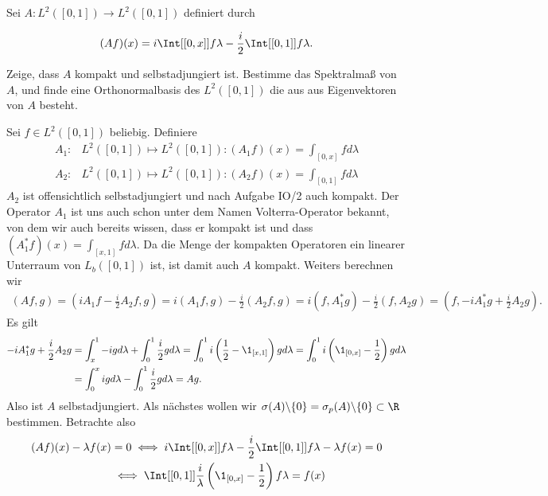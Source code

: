 \begin{exercise}[37/2]

Sei $A: L^2([0, 1]) \to L^2([0, 1])$ definiert durch

\begin{align*}
  (A f)(x)
  =
  i
  \Int[{[0, x]}]{f}{\lambda}
  - \frac{i}{2}
  \Int[{[0, 1]}]{f}{\lambda}.
\end{align*}

Zeige, dass $A$ kompakt und selbstadjungiert ist.
Bestimme das Spektralmaß von $A$, und finde eine Orthonormalbasis des $L^2([0, 1])$ die aus aus Eigenvektoren von $A$ besteht.

\end{exercise}

\begin{solution}
Sei $f \in L^2([0,1])$ beliebig. Definiere
\begin{align*}
  A_1:& L^2([0,1]) \mapsto L^2([0,1]): (A_1f)(x) = \int_{[0,x]}f d\lambda  \\
  A_2:& L^2([0,1]) \mapsto L^2([0,1]): (A_2f)(x) = \int_{[0,1]}f d\lambda
\end{align*}
$A_2$ ist offensichtlich selbstadjungiert und nach Aufgabe IO/2 auch kompakt.
Der Operator $A_1$ ist uns auch schon unter dem Namen Volterra-Operator bekannt,
von dem wir auch bereits wissen, dass er kompakt ist und dass
$(A_1^*f)(x) = \int_{[x,1]}f d\lambda$. Da die Menge der kompakten Operatoren
ein linearer Unterraum von $L_b([0,1])$ ist, ist damit auch $A$ kompakt.
Weiters berechnen wir
\begin{align*}
  (Af,g) = (iA_1f - \frac{i}{2}A_2f,g) = i(A_1f,g) - \frac{i}{2}(A_2f,g)
  = i(f,A_1^*g) - \frac{i}{2}(f,A_2g)
  = (f,-iA_1^*g + \frac{i}{2}A_2g).
\end{align*}
Es gilt
\begin{align*}
  -iA_1^*g + \frac{i}{2}A_2g &= \int_x^1 -ig d\lambda + \int_0^1\frac{i}{2}g d\lambda
  = \int_0^1i\left(\frac{1}{2} -\1_{[x,1]}\right)g d\lambda =
  \int_0^1i\left(\1_{[0,x]} -\frac{1}{2}\right)g d\lambda \\
  &= \int_0^x ig d\lambda - \int_0^1 \frac{i}{2}g d\lambda = Ag.
\end{align*}
Also ist $A$ selbstadjungiert. Als nächstes wollen wir
$\sigma(A)\backslash\{0\} = \sigma_p(A)\backslash\{0\} \subset \R$ bestimmen.
Betrachte also
\begin{align*}
  (A f)(x) - \lambda f(x) &= 0 \iff i\Int[{[0, x]}]{f}{\lambda}
  - \frac{i}{2}\Int[{[0, 1]}]{f}{\lambda} - \lambda f(x) = 0 \\
  &\iff \Int[{[0, 1]}]{\frac{i}{\lambda}\left(\1_{[0,x]} - \frac{1}{2}\right)f}{\lambda} = f(x)
\end{align*}
\end{solution}
